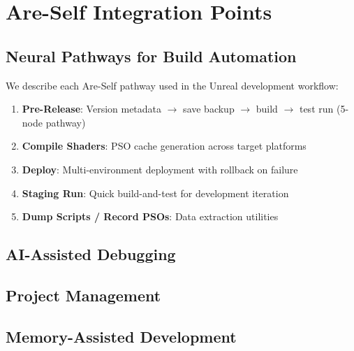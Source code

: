 \documentclass[man,12pt,floatsintext]{apa7}
\begin{document}
\section{Are-Self Integration Points}

\subsection{Neural Pathways for Build Automation}

We describe each Are-Self pathway used in the Unreal development workflow:

\begin{enumerate}
  \item \textbf{Pre-Release}: Version metadata $\rightarrow$ save backup $\rightarrow$
        build $\rightarrow$ test run (5-node pathway)
  \item \textbf{Compile Shaders}: PSO cache generation across target platforms
  \item \textbf{Deploy}: Multi-environment deployment with rollback on failure
  \item \textbf{Staging Run}: Quick build-and-test for development iteration
  \item \textbf{Dump Scripts / Record PSOs}: Data extraction utilities
\end{enumerate}

\subsection{AI-Assisted Debugging}


\subsection{Project Management}


\subsection{Memory-Assisted Development}
\end{document}
